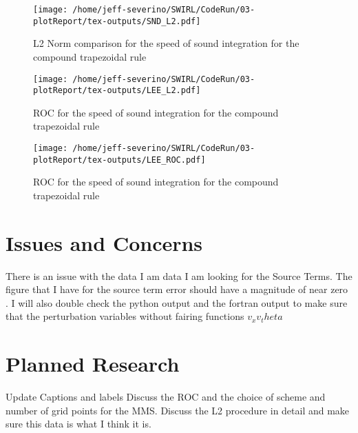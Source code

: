 \documentclass[a4paper]{article}
\begin{document}
\begin{figure}[!]
    \centering
    \texttt{[image: /home/jeff-severino/SWIRL/CodeRun/03-plotReport/tex-outputs/SND\_L2.pdf]}
    \caption{L2 Norm comparison for the speed of sound integration for the compound trapezoidal rule}
    \label{fig:4}
\end{figure}



\begin{figure}[!]
    \centering
    \texttt{[image: /home/jeff-severino/SWIRL/CodeRun/03-plotReport/tex-outputs/LEE\_L2.pdf]}
    \caption{ROC  for the speed of sound integration for the compound trapezoidal rule}
    \caption{}
    \label{fig:6}
\end{figure}


\begin{figure}[!]
    \centering
        \texttt{[image: /home/jeff-severino/SWIRL/CodeRun/03-plotReport/tex-outputs/LEE\_ROC.pdf]}
        \caption{}
       \caption{ROC  for the speed of sound integration for the compound trapezoidal rule}
        \label{fig:7}
\end{figure}





\section{Issues and Concerns}
There is an issue with the data I am data I am looking for the Source Terms. The 
figure that I have for the source term error should have a magnitude of near zero .
I will also double check the python output and the fortran output to make sure 
that the perturbation variables without fairing functions $v_x$$v_theta$
\section{Planned Research}
Update Captions and labels 
Discuss the ROC and the choice of scheme and number of grid points for the MMS.
Discuss the L2 procedure in detail and make sure this data is what I think it is.
\end{document}
